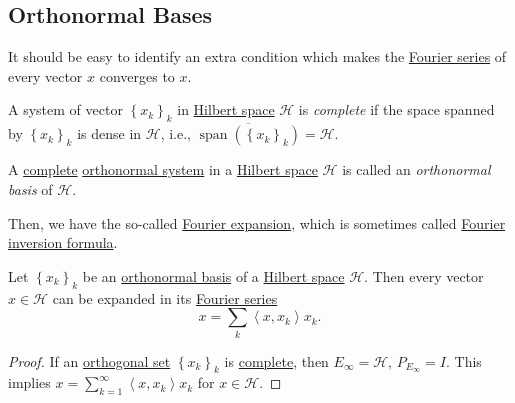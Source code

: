\subsection{Orthonormal Bases}
It should be easy to identify an extra condition which makes the \hyperref[def:Fourier-series]{Fourier series} of every vector \(x\) converges to \(x\).

\begin{definition}\label{def:complete-system}
	A system of vector \(\left\{ x_k\right\}_k\) in \hyperref[def:Hilbert-space]{Hilbert space} \(\mathcal{H} \) is \emph{complete} if the space spanned by \(\left\{ x_k\right\}_k\) is dense in \(\mathcal{H} \), i.e., \(\overline{\mathop{\mathrm{span}}(\left\{ x_k \right\} _k)} = \mathcal{H} \).
\end{definition}

\begin{definition}\label{def:orthonormal-basis}
	A \hyperref[def:complete-system]{complete} \hyperref[def:orthonormal-system]{orthonormal system} in a \hyperref[def:Hilbert-space]{Hilbert space} \(\mathcal{H} \) is called an \emph{orthonormal basis} of \(\mathcal{H} \).
\end{definition}

Then, we have the so-called \hyperref[thm:Fourier-expansion]{Fourier expansion}, which is sometimes called \href{https://en.wikipedia.org/wiki/Fourier_inversion_theorem}{Fourier inversion formula}.

\begin{theorem}\label{thm:Fourier-expansion}
	Let \(\left\{ x_k \right\} _k\) be an \hyperref[def:orthonormal-basis]{orthonormal basis} of a \hyperref[def:Hilbert-space]{Hilbert space} \(\mathcal{H} \). Then every vector \(x\in \mathcal{H} \) can be expanded in its \hyperref[def:Fourier-series]{Fourier series}
	\[
		x = \sum_{k} \left\langle x, x_k \right\rangle x_k.
	\]
\end{theorem}
\begin{proof}
	If an \hyperref[def:orthogonal-system]{orthogonal set} \(\left\{ x_{k} \right\}_k \) is \hyperref[def:complete-system]{complete}, then \(E_\infty = \mathcal{H} \), \(P_{E_\infty } = I\). This implies \(x = \sum_{k=1}^{\infty} \left\langle x, x_{k}  \right\rangle x_{k}\) for \(x\in \mathcal{H} \).
\end{proof}

